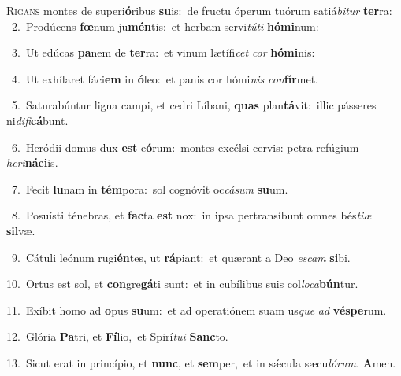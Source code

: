 \lettrine{\initial\textcolor{\initialcolor}{R}}{igans} montes de superi\-\textbf{ó}\-ribus \textbf{su}\-is:~\star de fructu óperum tuórum satiá\-\textit{bi}\-\textit{tur} \textbf{ter}\-ra:\\
{\numbfont\textcolor{\numbcolor}{~2.}}~Prodúcens \textbf{fœ}\-num ju\-\textbf{mén}\-tis:~\star et herbam servi\-\textit{tú}\-\textit{ti} \textbf{hó}\-\textbf{mi}num:\par
{\numbfont\textcolor{\numbcolor}{~3.}}~Ut edúcas \textbf{pa}\-nem de \textbf{ter}\-ra:~\star et vinum lætífi\textit{cet} \textit{cor} \textbf{hó}\-\textbf{mi}nis:\par
{\numbfont\textcolor{\numbcolor}{~4.}}~Ut exhílaret fáci\textbf{em} in \textbf{ó}\-leo:~\star et panis cor hómi\textit{nis} \textit{con}\-\textbf{fír}met.\par
{\numbfont\textcolor{\numbcolor}{~5.}}~Saturabúntur ligna campi, et cedri Líbani, \textbf{quas} plan\-\textbf{tá}\-vit:~\star illic pásseres ni\-\textit{di}\-\textit{fi}\textbf{cá}bunt.\par
{\numbfont\textcolor{\numbcolor}{~6.}}~Heródii domus dux \textbf{est} e\-\textbf{ó}\-rum:~\star montes excélsi cervis: petra refúgium \textit{he}\-\textit{ri}\textbf{ná}\textbf{ci}is.\par
{\numbfont\textcolor{\numbcolor}{~7.}}~Fecit \textbf{lu}\-nam in \textbf{tém}\-pora:~\star sol cognóvit oc\-\textit{cá}\-\textit{sum} \textbf{su}\-um.\par
{\numbfont\textcolor{\numbcolor}{~8.}}~Posuísti ténebras, et \textbf{fac}\-ta \textbf{est} nox:~\star in ipsa pertransíbunt omnes bés\-\textit{ti}\-\textit{æ} \textbf{sil}\-væ.\par
{\numbfont\textcolor{\numbcolor}{~9.}}~Cátuli leónum rugi\-\textbf{én}\-tes, ut \textbf{rá}\-piant:~\star et quærant a Deo \textit{es}\-\textit{cam} \textbf{si}\-bi.\par
{\numbfont\textcolor{\numbcolor}{10.}}~Ortus est sol, et \textbf{con}\-gre\-\textbf{gá}\-ti sunt:~\star et in cubílibus suis col\-\textit{lo}\-\textit{ca}\textbf{bún}tur.\par
{\numbfont\textcolor{\numbcolor}{11.}}~Exíbit homo ad \textbf{o}\-pus \textbf{su}\-um:~\star et ad operatiónem suam us\textit{que} \textit{ad} \textbf{vés}\-\textbf{pe}rum.\par
{\numbfont\textcolor{\numbcolor}{12.}}~Glória \textbf{Pa}\-tri, et \textbf{Fí}\-lio,~\star et Spirí\-\textit{tu}\-\textit{i} \textbf{Sanc}\-to.\par
{\numbfont\textcolor{\numbcolor}{13.}}~Sicut erat in princípio, et \textbf{nunc}\-, et \textbf{sem}\-per,~\star et in sǽcula sæcu\-\textit{ló}\-\textit{rum}. \textbf{A}\-men.\par
